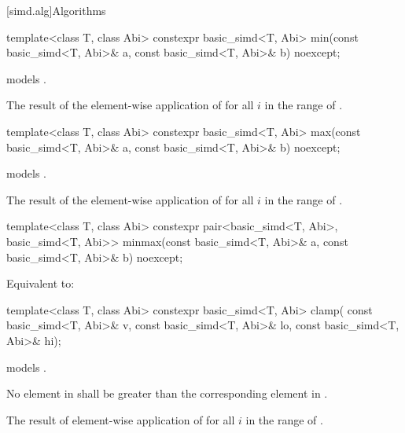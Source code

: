 [simd.alg]{Algorithms}

\begin{itemdecl}
template<class T, class Abi>
  constexpr basic_simd<T, Abi> min(const basic_simd<T, Abi>& a,
                                   const basic_simd<T, Abi>& b) noexcept;
\end{itemdecl}

\begin{itemdescr}
\pnum
\constraints
{} models .

\pnum
\returns
The result of the element-wise application of  for
all $i$ in the range of .
\end{itemdescr}

\begin{itemdecl}
template<class T, class Abi>
  constexpr basic_simd<T, Abi> max(const basic_simd<T, Abi>& a,
                                   const basic_simd<T, Abi>& b) noexcept;
\end{itemdecl}

\begin{itemdescr}
\pnum
\constraints
{} models .

\pnum
\returns
The result of the element-wise application of  for
all $i$ in the range of .
\end{itemdescr}

\begin{itemdecl}
template<class T, class Abi>
  constexpr pair<basic_simd<T, Abi>, basic_simd<T, Abi>>
    minmax(const basic_simd<T, Abi>& a, const basic_simd<T, Abi>& b) noexcept;
\end{itemdecl}

\begin{itemdescr}
\pnum
\effects
Equivalent to: 
\end{itemdescr}

\begin{itemdecl}
template<class T, class Abi>
  constexpr basic_simd<T, Abi> clamp(
    const basic_simd<T, Abi>& v, const basic_simd<T, Abi>& lo, const basic_simd<T, Abi>& hi);
\end{itemdecl}

\begin{itemdescr}
\pnum
\constraints
{} models .

\pnum
\expects
No element in  shall be greater than the corresponding element in
.

\pnum
\returns
The result of element-wise application of  for all $i$ in the range of .
\end{itemdescr}

